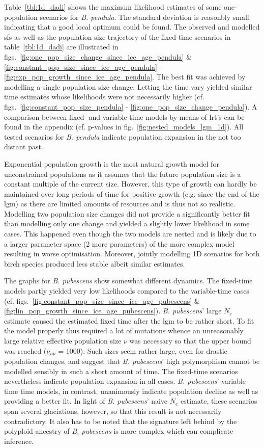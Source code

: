 \documentclass[hidelinks,11pt]{article}
\newcommand{\pendula}{\textit{B. pendula}}
\newcommand{\pubescens}{\textit{B. pubescens}}
\begin{document}
    Table~\ref{tbl:1d_dadi} shows the maximum likelihood estimates of some one-population scenarios for \pendula{}. The standard deviation is reasonbly small indicating that a good local optimum could be found. The observed and modelled \acrshort{sfs} as well as the population size trajectory of the fixed-time scenarios in table~\ref{tbl:1d_dadi} are illustrated in figs.~\ref{fig:one_pop_size_change_since_ice_age_pendula} \& \ref{fig:constant_pop_size_since_ice_age_pendula} - \ref{fig:exp_pop_growth_since_ice_age_pendula}. The best fit was achieved by modelling a single population size change. Letting the time vary yielded similar time estimates whose likelihoods were not necessarily higher (cf. figs.~\ref{fig:constant_pop_size_pendula} - \ref{fig:one_pop_size_change_pendula}). A comparison between fixed- and variable-time models by means of \acrshort{lrt}'s can be found in the appendix (cf. p-values in fig.~\ref{fig:nested_models_lgm_1d}). All tested scenarios for \pendula{} indicate population expansion in the not too distant past.

    Exponential population growth is the most natural growth model for unconstrained populations as it assumes that the future population size is a constant multiple of the current size. However, this type of growth can hardly be maintained over long periods of time for positive growth (e.g. since the end of the \acrshort{lgm}) as there are limited amounts of resources and is thus not so realistic. Modelling two population size changes did not provide a significantly better fit than modelling only one change and yielded a slightly lower likelihood in some cases. This happened even though the two models are nested and is likely due to a larger parameter space (2 more parameters) of the more complex model resulting in worse optimisation. Moreover, jointly modelling 1D scenarios for both birch species produced less stable albeit similar estimates.

    The graphs for \pubescens{} show somewhat different dynamics. The fixed-time models partly yielded very low likelihoods compared to the variable-time cases (cf. figs.~\ref{fig:constant_pop_size_since_ice_age_pubescens} \& \ref{fig:lin_pop_growth_since_ice_age_pubescens}). \pubescens{}' large $N_e$ estimate caused the estimated fixed time after the \acrshort{lgm} to be rather short. To fit the model properly thus required a lot of mutations whence an unreasonably large relative effective population size $\nu$ was necessary so that the upper bound was reached ($\nu_{up}$ = 1000). Such sizes seem rather large, even for drastic population changes, and suggest that \pubescens{}' high polymorphism cannot be modelled sensibly in such a short amount of time. The fixed-time scenarios nevertheless indicate population expansion in all cases. \pubescens{}' variable-time time models, in contrast, unanimously indicate population decline as well as providing a better fit. In light of \pubescens{}' naive $N_e$ estimate, these scenarios span several glaciations, however, so that this result is not necessarily contradictory. It also has to be noted that the signature left behind by the polyploid ancestry of \pubescens{} is more complex which can complicate inference.
\end{document}
